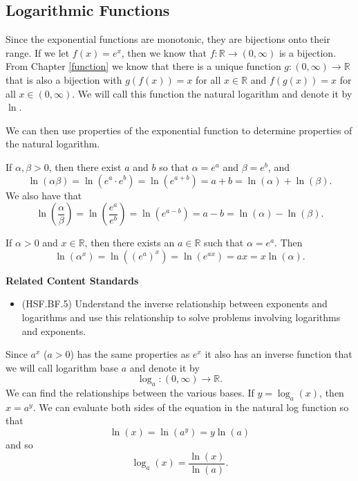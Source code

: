 \documentclass[
]{book}
\providecommand{\tightlist}{%
  \setlength{\itemsep}{0pt}\setlength{\parskip}{0pt}}
\newenvironment{standards}{}{}
\theoremstyle{definition}
\theoremstyle{definition}
\theoremstyle{definition}
\theoremstyle{definition}
\theoremstyle{remark}
\begin{document}
\hypertarget{logarithmic-functions}{%
\subsection{Logarithmic Functions}\label{logarithmic-functions}}

Since the exponential functions are monotonic, they are bijections onto their range. If we let \(f(x)=e^x\), then we know that \(f:\mathbb{R} \rightarrow (0,\infty)\) is a bijection. From Chapter \ref{function} we know that there is a unique function \(g:(0,\infty) \rightarrow \mathbb{R}\) that is also a bijection with \(g(f(x))=x\) for all \(x\in \mathbb{R}\) and \(f(g(x))=x\) for all \(x\in (0,\infty)\). We will call this function the natural logarithm and denote it by \(\ln\).

We can then use properties of the exponential function to determine properties of the natural logarithm.

If \(\alpha,\beta >0\), then there exist \(a\) and \(b\) so that \(\alpha = e^a\) and \(\beta = e^b\), and \[\ln (\alpha \beta) = \ln \left( e^a \cdot e^b\right) = \ln \left(e^{a+b}\right) = a+b = \ln (\alpha) + \ln (\beta). \] We also have that
\[\ln \left(\frac{\alpha}{\beta}\right) = \ln \left( \frac{e^a}{e^b} \right) = \ln \left( e^{a-b} \right) = a-b = \ln(\alpha) - \ln(\beta).\]

If \(\alpha>0\) and \(x\in \mathbb{R}\), then there exists an \(a\in \mathbb{R}\) such that \(\alpha=e^a\). Then
\[\ln \left(\alpha^x\right) = \ln \left( \left(e^a\right)^x\right) = \ln \left( e^{ax} \right) = ax = x \ln(\alpha).\]

\begin{standards}

\begin{center}
\textbf{Related Content Standards}

\end{center}

\begin{itemize}
\tightlist
\item
  (HSF.BF.5) Understand the inverse relationship between exponents and logarithms and use this relationship to solve problems involving logarithms and exponents.\\
\end{itemize}

\end{standards}

Since \(a^x\) (\(a>0\)) has the same properties as \(e^x\) it also has an inverse function that we will call logarithm base \(a\) and denote it by \[ \log_a: (0,\infty) \rightarrow \mathbb{R}.\] We can find the relationships between the various bases. If \(y= \log_a(x)\), then \(x=a^y\). We can evaluate both sides of the equation in the natural log function so that
\[\ln(x) = \ln\left(a^y\right) = y \ln (a)\] and so
\[\log_a(x) = \frac{\ln(x)}{\ln(a)}.\]
\end{document}
